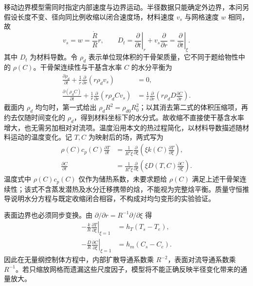 移动边界模型需同时指定内部速度与边界运动\cite{shrinkage2019,zhu2021}。半径数据只能确定外边界，本问另假设长度不变、径向同比例收缩以闭合速度场，材料速度 $v_s$ 与网格速度 $w$ 相同，故
\begin{equation}
v_s=w=\frac{\dot R}{R}r,\qquad
D_t=\left.\frac{\partial}{\partial t}\right|_r
+v_s\frac{\partial}{\partial r}
=\left.\frac{\partial}{\partial t}\right|_\xi.
\label{eq:chainmoving}
\end{equation}
其中 $D_t$ 为材料导数。令 $\rho_d$ 表示单位现体积的干骨架质量，它不同于题给物性中的 $\rho(C)$。干骨架连续性与干基含水率 $C$ 的水分平衡为
\begin{align*}
\frac{\partial\rho_d}{\partial t}
+\frac1r\frac{\partial}{\partial r}(r\rho_dv_s)&=0,\\
\frac{\partial(\rho_dC)}{\partial t}
+\frac1r\frac{\partial}{\partial r}(r\rho_dCv_s)
&=\frac1r\frac{\partial}{\partial r}
\left(r\rho_dD\frac{\partial C}{\partial r}\right).
\end{align*}
截面内 $\rho_d$ 均匀时，第一式给出 $\rho_dR^2=\rho_{d0}R_0^2$；以其消去第二式的体积压缩项，再约去仅随时间变化的 $\rho_d$，得到材料坐标下的水分式。故收缩不直接使干基含水率增大，也无需另加相对对流项。温度沿用本文的热过程简化，以材料导数描述随材料运动的温度变化。记 $T,C$ 为映射后的场，两式写为
\begin{equation}
\begin{aligned}
\rho(C)c_p(C)\frac{\partial T}{\partial t}
&=\frac{1}{R^2\xi}\frac{\partial}{\partial\xi}
\left(\xi k(C)\frac{\partial T}{\partial\xi}\right),\\
\frac{\partial C}{\partial t}
&=\frac{1}{R^2\xi}\frac{\partial}{\partial\xi}
\left(\xi D(T,C)\frac{\partial C}{\partial\xi}\right).
\end{aligned}
\label{eq:moving}
\end{equation}
温度式中 $\rho(C)c_p(C)$ 仅作为储热系数，未要求题给 $\rho(C)$ 满足上述干骨架连续性；该式不含蒸发潜热及水分迁移携带的焓，不能视为完整焓平衡。质量守恒推导说明水分方程与既定收缩闭合相容，不构成对均匀变形的实验验证。

表面边界也必须同步变换。由 $\partial/\partial r=R^{-1}\partial/\partial\xi$ 得
\begin{align}
-\frac{k}{R}\left.\frac{\partial T}{\partial\xi}\right|_{\xi=1}
&=h_T(T_s-T_e),\label{eq:movingheatbc}\\
-\frac{D}{R}\left.\frac{\partial C}{\partial\xi}\right|_{\xi=1}
&=h_m(C_s-C_e).
\label{eq:movingmassbc}
\end{align}
因此在无量纲控制体方程中，内部扩散导通系数乘 $R^{-2}$，表面对流导通系数乘 $R^{-1}$。若只缩放网格而遗漏这些尺度因子，模型将不能正确反映半径变化带来的通量放大。

